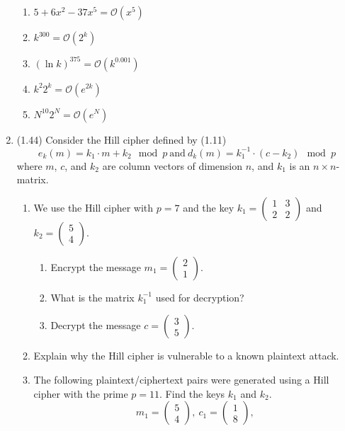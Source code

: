 \documentclass[12pt]{amsart}
\theoremstyle{definition}
\begin{document}
\begin{enumerate}
\begin{enumerate}
		\item $5+6x^2-37x^5 = \mathcal O(x^5)$
		\item $k^{300} = \mathcal O(2^k)$ 
		\item $(\ln k)^{375} = \mathcal O(k^{0.001})$
		\item $k^2 2^k = \mathcal O(e^{2k})$
		\item $N^{10} 2^N = \mathcal O(e^N)$
	\end{enumerate}
\item (1.44) Consider the Hill cipher defined by (1.11) 
	\begin{displaymath}
		e_k(m) = k_1 \cdot m + k_2 \mod p \ \text{and} \ d_k(m) = k_1^{-1} \cdot (c - k_2) \mod p
	\end{displaymath}
	where $m$, $c$, and $k_2$ are column vectors of dimension $n$, and $k_1$ is an $n \times n$-matrix. 
	\begin{enumerate}
		\item We use the Hill cipher with $p=7$ and the key $k_1 = \begin{pmatrix} 1 & 3 \\ 2 & 2 
		\end{pmatrix}$ and $k_2 = \begin{pmatrix} 5 \\ 4 \end{pmatrix}$. 
		\begin{enumerate}
			\item Encrypt the message $m_1 = \begin{pmatrix} 2 \\ 1 \end{pmatrix}$. 
			\item What is the matrix $k_1^{-1}$ used for decryption?
			\item Decrypt the message $c = \begin{pmatrix} 3 \\ 5 \end{pmatrix}$.
		\end{enumerate}
		\item Explain why the Hill cipher is vulnerable to a known plaintext attack. 
		\item The following plaintext/ciphertext pairs were generated using a Hill cipher with 
			the prime $p=11$. Find the keys $k_1$ and $k_2$. 
		\begin{displaymath}
			m_1 = \begin{pmatrix} 5 \\ 4 \end{pmatrix}, \ c_1 = \begin{pmatrix} 1 \\ 8 \end{pmatrix}, 

\end{displaymath}
\end{enumerate}
\end{enumerate}
\end{document}
